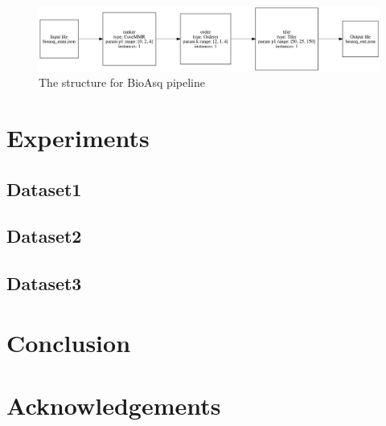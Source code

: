 \documentclass{article}
\begin{document}
    \begin{figure}[H]
        \begin{center}
            \includegraphics[width=\textwidth]{fig/bioasq_pipeline.png}
        \end{center}
        \label{fig:bioasq_pipeline}
        \caption{The structure for BioAsq pipeline}
    \end{figure}


\section{Experiments}
    \subsection{Dataset1}
    \subsection{Dataset2}
    \subsection{Dataset3}

\section{Conclusion}

\section*{Acknowledgements}
\end{document}
